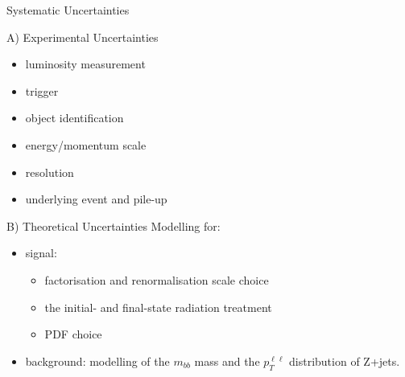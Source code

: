 \documentclass[10pt]{beamer} %
\begin{document}
\begin{frame}{Systematic Uncertainties}
    \begin{block}{A) Experimental Uncertainties}
    
        \begin{minipage}[b]{0.49\linewidth}
            \begin{itemize}
                \item luminosity measurement
                \item trigger
                \item object identification
            \end{itemize}

        \end{minipage}
        \hfill
        \begin{minipage}[b]{0.49\linewidth}
            \begin{itemize}
                \item energy/momentum scale
                \item resolution
                \item underlying event and pile-up
            \end{itemize}
        \end{minipage}

    \end{block}

    \begin{block}{B) Theoretical Uncertainties}
Modelling for:
    \begin{itemize}
        \item signal: 
        \begin{itemize}
            \item factorisation and renormalisation scale choice
            \item the initial- and final-state radiation treatment
            \item PDF choice
        \end{itemize}
        
        \item background: modelling of the $m_{bb}$ mass and the $p_{T}^{\ell\ell}$ distribution of Z+jets.
    \end{itemize}
    
    \end{block}

\end{frame}
\end{document}

